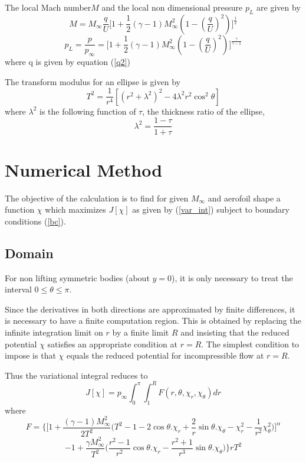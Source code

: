 \documentclass[a4paper]{article}
\begin{document}
	The local Mach number$M$ and the local non dimensional pressure $p_L$ are given by
	\begin{equation}\label{mach}
		M = M_\infty\frac{q}{U}
		\Biggl[
			1 + \frac{1}{2}(\gamma-1)M_\infty^2
			\left(1-\left(\frac{q}{U}\right)^2\right)
		\Biggr]	^\frac{1}{2}
	\end{equation}
	\begin{equation}\label{pressure}
		p_L = \frac{p}{p_\infty} = 
		\Biggl[
			1 + \frac{1}{2}(\gamma-1)M_\infty^2
			\left(1-\left(\frac{q}{U}\right)^2\right)		
		\Biggr]^\frac{\gamma}{\gamma-1}
	\end{equation}
	where q is given by equation (\ref{q2})
	
	The transform modulus for an ellipse is given by
	\begin{equation}\label{T}
		T^2 = \frac{1}{r^4} \left[
			\left(r^2+\lambda^2\right)^2 - 
			4\lambda^2r^2\cos^2\theta
		\right]
	\end{equation}		
	where $\lambda^2$ is the following function of $\tau$, the thickness ratio of the ellipse,
	\begin{equation}
		\lambda^2 = \frac{1-\tau}{1+\tau}
	\end{equation}
	
  	\section{Numerical Method}
	
	The objective of the calculation is to find for given $M_\infty$ and aerofoil shape a function $\chi$ which maximizes $J[\chi]$ as given by (\ref{var_int}) subject to boundary conditions (\ref{bc}).
	
	
	\subsection{Domain}
	For non lifting symmetric bodies (about $y=0$), it is only necessary to treat the interval $0 \leq \theta  \leq \pi$.
	
	Since the derivatives in both directions are approximated by finite differences, it is necessary to have a finite computation region. This is obtained by replacing the infinite integration limit on $r$ by a finite limit $R$ and insisting that the reduced potential $\chi$ satisfies an appropriate condition at $r=R$. The simplest condition to impose is that $\chi$ equals the reduced potential for incompressible flow at $r=R$. 
	
	Thus the variational integral reduces to
	\begin{equation}\label{var_int_reduced}
	J[\chi] = p_\infty \int^\pi_0 \int^R_1 F(r,\theta,\chi_r,\chi_\theta)dr
	\end{equation}
	where
	$$
	F = \Biggl\{
			\Biggl[
				1 + \frac{(\gamma-1)M_\infty^2}{2T^2}
				\Biggl(
					T^2-1-2\cos\theta.\chi_r+\frac{2}{r}\sin\theta.\chi_\theta - \chi_r^2-\frac{1}{r^2}\chi_\theta^2
				\Biggr)
			\Biggr]^\alpha
			$$
			$$
			-1+\frac{\gamma M_\infty^2}{T^2}
			\Biggl(
				\frac{r^2-1}{r^2}\cos\theta.\chi_r
				- \frac{r^2+1}{r^3}\sin\theta.\chi_\theta
			\Biggr)
		\Biggr\}rT^2
	$$
	
\end{document}
